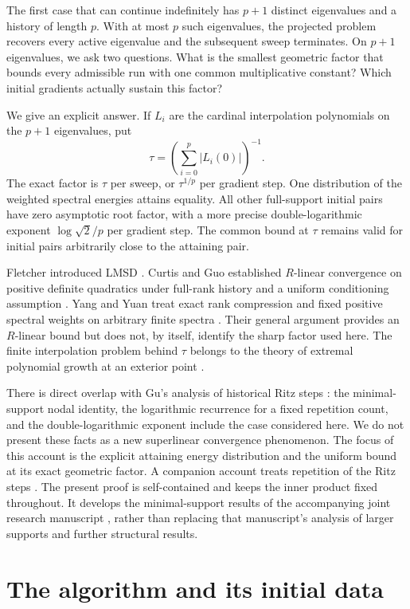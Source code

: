 \documentclass[11pt,a4paper]{article}
\numberwithin{equation}{section}
\begin{document}
The first case that can continue indefinitely has \(p+1\) distinct
eigenvalues and a history of length \(p\). With at most \(p\) such
eigenvalues, the projected problem recovers every active eigenvalue
and the subsequent sweep terminates. On \(p+1\) eigenvalues, we ask two
questions. What is the smallest geometric factor that bounds every
admissible run with one common multiplicative constant? Which initial
gradients actually sustain this factor?

We give an explicit answer. If \(L_i\) are the cardinal interpolation
polynomials on the \(p+1\) eigenvalues, put
\[
 \tau=\left(\sum_{i=0}^{p}|L_i(0)|\right)^{-1}.
\]
The exact factor is \(\tau\) per sweep, or \(\tau^{1/p}\) per gradient
step. One distribution of the weighted spectral energies attains
equality. All other full-support initial pairs have zero asymptotic
root factor, with a more precise double-logarithmic exponent
\(\log\sqrt2/p\) per gradient step. The common bound at \(\tau\) remains
valid for initial pairs arbitrarily close to the attaining pair.

Fletcher introduced LMSD \cite{Fletcher}. Curtis and Guo established
\(R\)-linear convergence on positive definite quadratics under
full-rank history and a uniform conditioning assumption
\cite{CurtisGuo}. Yang and Yuan treat exact rank compression and fixed
positive spectral weights on arbitrary finite spectra
\cite{YangYuan}. Their general argument provides an \(R\)-linear
bound but does not, by itself, identify the sharp factor used here.
The finite interpolation problem behind \(\tau\) belongs to the
theory of extremal polynomial growth at an exterior point
\cite{Bos}.

There is direct overlap with Gu's analysis of historical Ritz steps
\cite[Section~3]{Gu}: the minimal-support nodal identity, the
logarithmic recurrence for a fixed repetition count, and the
double-logarithmic exponent include the case considered here.
We do not present these facts as a new superlinear convergence
phenomenon. The focus of this account is the explicit attaining
energy distribution and the uniform bound at its exact geometric
factor. A companion account treats repetition of the Ritz steps
\cite{ReuseNote}. The present proof is self-contained and keeps the
inner product fixed throughout. It develops the minimal-support
results of the accompanying joint research manuscript
\cite{ArchiveA}, rather than replacing that manuscript's analysis
of larger supports and further structural results.

\section{The algorithm and its initial data}\label{sec:algorithm}
\end{document}
